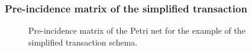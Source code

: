 \documentclass{beamer}
\begin{document}
\begin{frame}
    \frametitle{Pre-incidence matrix of the simplified transaction}
    \begin{figure}
        \vspace{.2cm}
        \caption{Pre-incidence matrix of the Petri net for the example of the simplified transaction schema.}
        \label{Pre-esempio1}
    \end{figure}
\end{frame}
\end{document}
